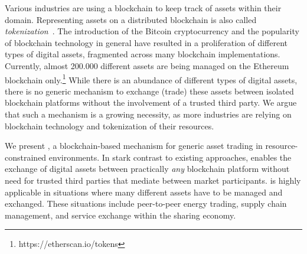 
Various industries are using a blockchain to keep track of assets within their domain.
Representing assets on a distributed blockchain is also called \emph{tokenization}~\cite{TokenizationOP}.
The introduction of the Bitcoin cryptocurrency and the popularity of blockchain technology in general have resulted in a proliferation of different types of digital assets, fragmented across many blockchain implementations.
Currently, almost 200.000 different assets are being managed on the Ethereum blockchain only.\footnote{https://etherscan.io/tokens} %
While there is an abundance of different types of digital assets, there is no generic mechanism to exchange (trade) these assets between isolated blockchain platforms without the involvement of a trusted third party.
We argue that such a mechanism is a growing necessity, as more industries are relying on blockchain technology and tokenization of their resources.


We present \emph{\ModelName{}}, a blockchain-based mechanism for generic asset trading in resource-constrained environments.
In stark contrast to existing approaches, \ModelName{} enables the exchange of digital assets between practically \emph{any} blockchain platform without need for trusted third parties that mediate between market participants.
\ModelName{} is highly applicable in situations where many different assets have to be managed and exchanged.
These situations include peer-to-peer energy trading, supply chain management, and service exchange within the sharing economy.

